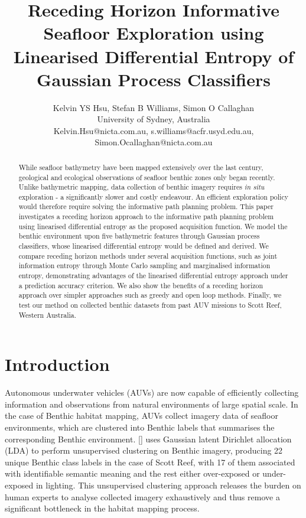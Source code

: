 \documentclass{article}
\title{Receding Horizon Informative Seafloor Exploration using Linearised Differential Entropy of Gaussian Process Classifiers}
\author{Kelvin YS Hsu, Stefan B Williams, Simon O Callaghan \\ University of Sydney, Australia \\ 
Kelvin.Hsu@nicta.com.au, s.williams@acfr.usyd.edu.au, Simon.Ocallaghan@nicta.com.au}
\newcommand{\incite}[1]{\citeauthor{#1} [\citeyear{#1}]}
\begin{document}
\maketitle

\begin{abstract}
	While seafloor bathymetry have been mapped extensively over the last century, geological and ecological observations of seafloor benthic zones only began recently. Unlike bathymetric mapping, data collection of benthic imagery requires \textit{in situ} exploration - a significantly slower and costly endeavour. An efficient exploration policy would therefore require solving the informative path planning problem. This paper investigates a receding horizon approach to the informative path planning problem using linearised differential entropy as the proposed acquisition function. We model the benthic environment upon five bathymetric features through Gaussian process classifiers, whose linearised differential entropy would be defined and derived. We compare receding horizon methods under several acquisition functions, such as joint information entropy through Monte Carlo sampling and marginalised information entropy, demonstrating advantages of the linearised differential entropy approach under a prediction accuracy criterion. We also show the benefits of a receding horizon approach over simpler approaches such as greedy and open loop methods. Finally, we test our method on collected benthic datasets from past AUV missions to Scott Reef, Western Australia.
\end{abstract}

\section{Introduction}
\label{Section:Introduction}

	Autonomous underwater vehicles (AUVs) are now capable of efficiently collecting information and observations from natural environments of large spatial scale. In the case of Benthic habitat mapping, AUVs collect imagery data of seafloor environments, which are clustered into Benthic labels that summarises the corresponding Benthic environment. \incite{Steinberg2015128} uses Gaussian latent Dirichlet allocation (LDA) to perform unsupervised clustering on Benthic imagery, producing 22 unique Benthic class labels in the case of Scott Reef, with 17 of them associated with identifiable semantic meaning and the rest either over-exposed or under-exposed in lighting. This unsupervised clustering approach releases the burden on human experts to analyse collected imagery exhaustively and thus remove a significant bottleneck in the habitat mapping process.
	
\end{document}
